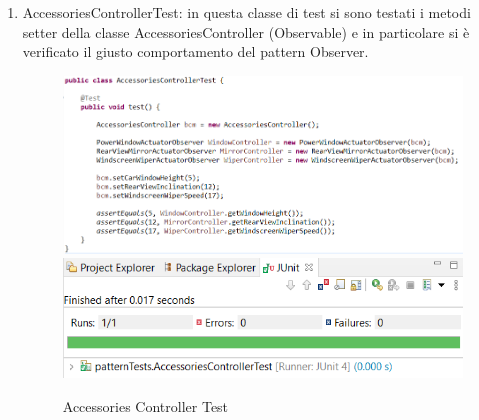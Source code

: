 \documentclass{article}
\begin{document}
\begin{enumerate}
\item AccessoriesControllerTest: in questa classe di test si sono testati i metodi setter della classe AccessoriesController (Observable) e in particolare si è verificato il giusto comportamento del pattern Observer.
\begin{figure} [H]
\begin{center}
\includegraphics[scale=0.6]{AccessoriesControllerTest.png}
\includegraphics[scale=0.6]{AccessoriesControllerTestJUnit.png}
\end{center}
\caption{Accessories Controller Test}
\end{figure}


\end{enumerate}
\end{document}
